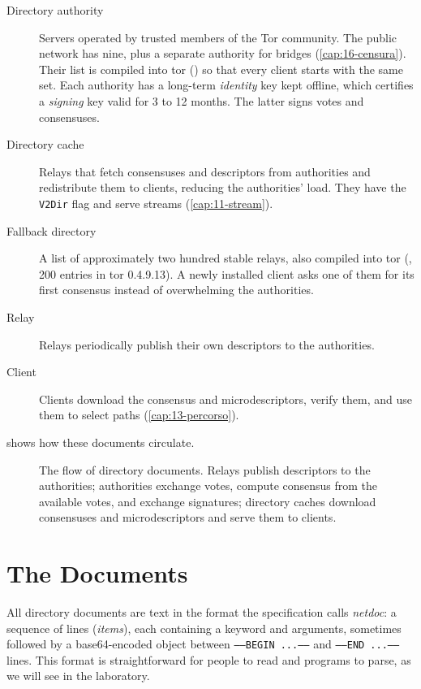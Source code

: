 \begin{description}
  \item[Directory authority] Servers operated by trusted members of the Tor community. The public network has nine, plus a separate authority for bridges (\cref{cap:16-censura}). Their list is compiled into tor () so that every client starts with the same set. Each authority has a long-term \emph{identity} key kept offline, which certifies a \emph{signing} key valid for 3 to 12 months. The latter signs votes and consensuses.
  \item[Directory cache] Relays that fetch consensuses and descriptors from authorities and redistribute them to clients, reducing the authorities' load. They have the \texttt{V2Dir} flag and serve  streams (\cref{cap:11-stream}).
  \item[Fallback directory] A list of approximately two hundred stable relays, also compiled into tor (, 200 entries in tor 0.4.9.13). A newly installed client asks one of them for its first consensus instead of overwhelming the authorities.
  \item[Relay] Relays periodically publish their own descriptors to the authorities.
  \item[Client] Clients download the consensus and microdescriptors, verify them, and use them to select paths (\cref{cap:13-percorso}).
\end{description}

 shows how these documents circulate.

\begin{figure}[htbp]
\centering

\caption{The flow of directory documents. Relays publish descriptors to the authorities; authorities exchange votes, compute consensus from the available votes, and exchange signatures; directory caches download consensuses and microdescriptors and serve them to clients.}
\label{fig:dir-flusso}
\end{figure}

\section{The Documents}\label{sec:dir-documenti}

All directory documents are text in the format the specification calls \emph{netdoc}: a sequence of lines (\emph{items}), each containing a keyword and arguments, sometimes followed by a base64-encoded object between \texttt{-----BEGIN ...-----} and \texttt{-----END ...-----} lines. This format is straightforward for people to read and programs to parse, as we will see in the laboratory.

